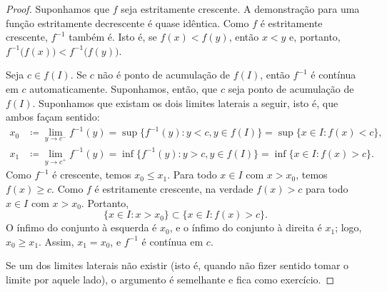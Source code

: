 \begin{proof}
Suponhamos que $f$ seja estritamente crescente. A demonstração para uma função estritamente decrescente é quase
idêntica.
Como $f$ é estritamente crescente, $f^{-1}$ também é. Isto é, se $f(x) <
f(y)$, então $x < y$ e, portanto,
$f^{-1}\bigl(f(x)\bigr) < f^{-1}\bigl(f(y)\bigr)$.

Seja $c \in f(I)$.
Se $c$ não é ponto de acumulação de $f(I)$, então $f^{-1}$ é contínua em $c$
automaticamente. Suponhamos, então, que $c$ seja ponto de acumulação de $f(I)$.
Suponhamos que existam os dois limites laterais a seguir, isto é, que ambos
façam sentido:
\begin{align*}
x_0 & \coloneqq \lim_{y \to c^-} f^{-1}(y) =
\sup \bigl\{ f^{-1}(y) : y < c, y \in f(I) \bigr\}
=
\sup \bigl\{ x \in I : f(x) < c \bigr\} , \\
x_1 & \coloneqq \lim_{y \to c^+} f^{-1}(y) =
\inf \bigl\{ f^{-1}(y) : y > c, y \in f(I) \bigr\}
=
\inf \bigl\{ x \in I : f(x) > c \bigr\} .
\end{align*}
Como $f^{-1}$ é crescente, temos $x_0 \leq x_1$.
Para todo $x \in I$ com $x > x_0$, temos $f(x) \geq c$. Como $f$ é estritamente crescente,
na verdade $f(x) > c$ para todo $x \in I$ com $x > x_0$. Portanto,
\begin{equation*}
\{ x \in I : x > x_0 \} \subset \bigl\{ x \in I : f(x) > c \bigr\}.
\end{equation*}
O ínfimo do conjunto à esquerda é $x_0$, e o ínfimo do conjunto à direita
é $x_1$; logo, $x_0 \geq x_1$.
Assim, $x_1 = x_0$, e $f^{-1}$ é contínua em $c$.

Se um dos limites laterais não existir (isto é, quando não
fizer sentido tomar o limite por aquele lado), o argumento é semelhante
e fica como exercício.
\end{proof}

